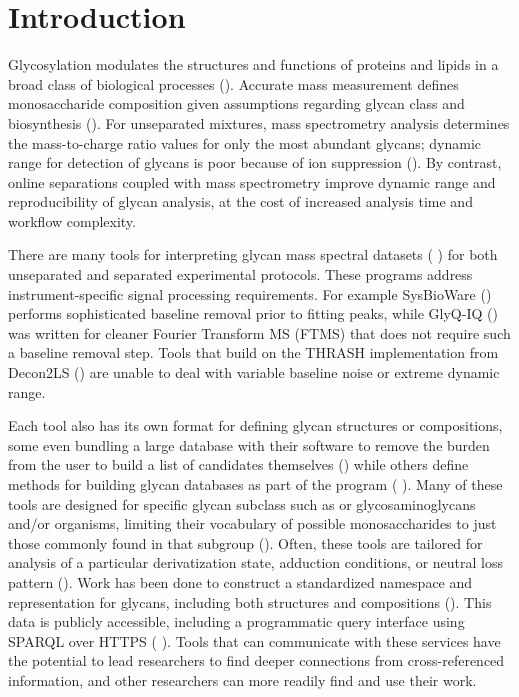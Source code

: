 \section{Introduction}

Glycosylation modulates the structures and functions of proteins and lipids
in a broad class of biological processes (\cite{Varki2017}). Accurate mass
measurement defines monosaccharide composition given assumptions regarding
glycan class and biosynthesis (\cite{Zaia2008}). For unseparated mixtures,
mass spectrometry analysis determines the mass-to-charge ratio values for
only the most abundant glycans; dynamic range for detection of glycans is
poor because of ion suppression (\cite{Peltoniemi2013}). By contrast, online
separations coupled with mass spectrometry improve dynamic range and
reproducibility of glycan analysis, at the cost of increased analysis time
and workflow complexity.

There are many tools for interpreting glycan mass spectral datasets (
\cite{Yu2013,Peltoniemi2013,Kronewitter2014,Goldberg2009,Maxwell2012,Ceroni2008,Frank2010})
for both unseparated and separated experimental protocols. These programs address
instrument-specific signal processing requirements. For example SysBioWare
(\cite{Frank2010}) performs sophisticated baseline removal prior to fitting
peaks, while GlyQ-IQ (\cite{Kronewitter2014}) was written for cleaner Fourier Transform
MS (FTMS) that does not require such a baseline removal step. Tools that build on
the THRASH implementation from Decon2LS (\cite{Jaitly2009,Yu2013,Maxwell2012})
are unable to deal with variable baseline noise or extreme dynamic range.

Each tool also has its own format for defining glycan structures or compositions,
some even bundling a large database with their software to remove the burden from
the user to build a list of candidates themselves (\cite{Yu2013,Kronewitter2014,Goldberg2009})
while others define methods for building glycan databases as part of the program (
\cite{Maxwell2012,Ceroni2008}). Many of these tools are designed for specific glycan
subclass such as \nglycans or glycosaminoglycans and/or organisms, limiting their
vocabulary of possible monosaccharides to just those commonly found in that subgroup
(\cite{Yu2013,Kronewitter2014,Peltoniemi2013,Goldberg2009}). Often, these tools are
tailored for analysis of a particular derivatization state, adduction conditions, or
neutral loss pattern (\cite{Yu2013,Peltoniemi2013,Maxwell2012}). Work has been done
to construct a standardized namespace and representation for glycans, including both
structures and compositions (\cite{Tiemeyer2017,Campbell2014}). This data is publicly
accessible, including a programmatic query interface using SPARQL over HTTPS (
\cite{Aoki-Kinoshita2015}). Tools that can communicate with these services have the
potential to lead researchers to find deeper connections from cross-referenced information,
and other researchers can more readily find and use their work.

